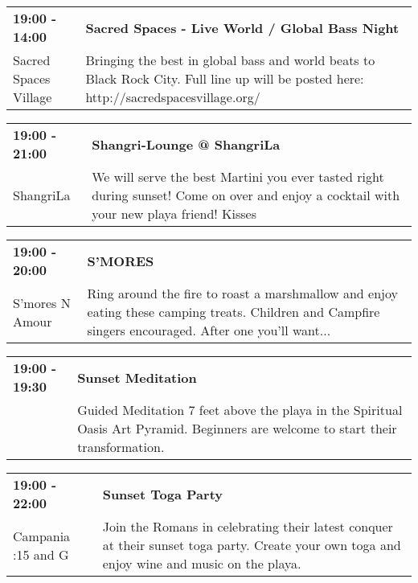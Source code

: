 \begin{tabular}{ p{1in} p{2.2in} }
    \textbf{19:00 - 14:00} & \textbf{Sacred Spaces - Live World / Global Bass Night} \\
    Sacred Spaces Village \newline  & Bringing the best in global bass and world beats to Black Rock City. Full line up will be posted here: http://sacredspacesvillage.org/ \\
    \hline 
\end{tabular}
    
\begin{tabular}{ p{1in} p{2.2in} }
    \textbf{19:00 - 21:00} & \textbf{Shangri-Lounge @ ShangriLa} \\
    ShangriLa \newline  & We will serve the best Martini you ever tasted right during sunset! Come on over and enjoy a  cocktail with your new playa friend! Kisses \\
    \hline 
\end{tabular}
    
\begin{tabular}{ p{1in} p{2.2in} }
    \textbf{19:00 - 20:00} & \textbf{S'MORES} \\
    S'mores N Amour \newline  & Ring around the fire to roast a marshmallow and enjoy eating these camping treats. Children and Campfire singers encouraged. After one you'll want... \\
    \hline 
\end{tabular}
    
\begin{tabular}{ p{1in} p{2.2in} }
    \textbf{19:00 - 19:30} & \textbf{Sunset Meditation} \\
    ~ \newline  & Guided Meditation 7 feet above the playa in the Spiritual Oasis Art Pyramid. Beginners are welcome to start their transformation. \\
    \hline 
\end{tabular}
    
\begin{tabular}{ p{1in} p{2.2in} }
    \textbf{19:00 - 22:00} & \textbf{Sunset Toga Party} \\
    Campania \newline 3:15 and G & Join the Romans in celebrating their latest conquer at their sunset toga party. Create your own toga and enjoy wine and music on the playa. \\
    \hline 
\end{tabular}
    
